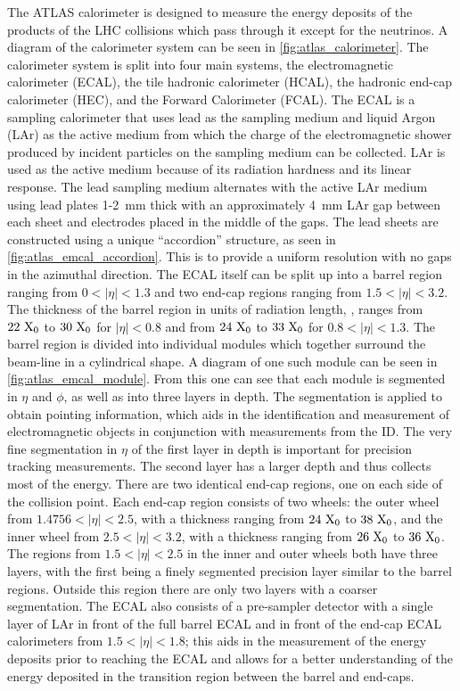 The ATLAS calorimeter is designed to measure the energy
deposits of the products of the LHC collisions which pass through
it except for the neutrinos.  A diagram of the 
calorimeter system can be seen in \fig\ref{fig:atlas_calorimeter}.
The calorimeter system is split into four main systems, 
the electromagnetic calorimeter (ECAL), the 
tile hadronic calorimeter (HCAL), the hadronic 
end-cap calorimeter (HEC), 
and the Forward Calorimeter (FCAL).
The ECAL is a sampling calorimeter that uses lead as the sampling
medium and liquid Argon (LAr) as
the active medium from which the charge of the electromagnetic
shower produced by incident particles on the sampling medium
can be collected.  LAr is used as the active medium 
because of its radiation hardness and its linear response.
The lead sampling medium alternates with the active LAr medium
using lead plates 1-2~mm thick with an approximately 4~mm 
LAr gap between each sheet and electrodes placed in the middle of
the gaps.
The lead sheets are constructed using a unique ``accordion'' structure,
as seen in \fig\ref{fig:atlas_emcal_accordion}. 
This is to provide a uniform resolution with no gaps
in the azimuthal direction.
The ECAL itself can be split up into a barrel region ranging
from $0<|\eta|<1.3$ and two end-cap regions ranging from 
$1.5 < |\eta| < 3.2$.
The thickness of the barrel region in units of radiation length, \xzero,
ranges from $22~\textrm{X}_0$ to $30~\textrm{X}_0$
for $|\eta|<0.8$ and from $24~\textrm{X}_0$ to $33~\textrm{X}_0$ for
$0.8 < |\eta| < 1.3$.
The barrel region is divided into individual modules
which together surround the beam-line
in a cylindrical shape.  A diagram of one such module
can be seen in \fig\ref{fig:atlas_emcal_module}.
From this one can see that each module is segmented in $\eta$
and $\phi$, as well as into three layers in depth.
The segmentation is applied to obtain pointing information, 
which aids in the identification and measurement of electromagnetic
objects in conjunction with measurements from the ID.
The very fine segmentation in $\eta$ of the first layer
in depth is important for precision tracking measurements.
The second layer has a larger depth and thus collects most of the energy.
There are two identical end-cap regions, one on each side of the 
collision point. Each end-cap region consists of two wheels: the 
outer wheel from $1.4756 < |\eta| < 2.5$, with a thickness ranging from
$24~\textrm{X}_0$ to $38~\textrm{X}_0$, and 
the inner wheel from $2.5 < |\eta| < 3.2$, with a thickness ranging from
$26~\textrm{X}_0$ to $36~\textrm{X}_0$.
The regions from $1.5 < |\eta|<2.5$ in the inner and outer wheels both
have three layers, with the first being a finely segmented precision
layer similar to the barrel regions. Outside this region there 
are only two layers with a coarser segmentation.
The ECAL also consists of a pre-sampler detector with a single layer of LAr in 
front of the full barrel ECAL and in front of the end-cap ECAL calorimeters
from $1.5 < |\eta| < 1.8$; this aids in the measurement of the energy deposits
prior to reaching the ECAL and allows 
for a better understanding of the energy deposited
in the transition region between the barrel and end-caps.


